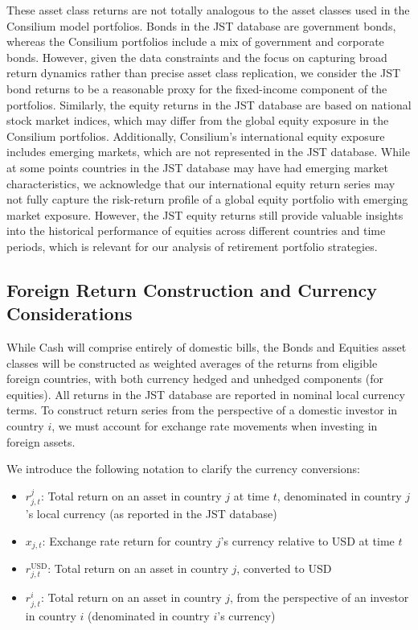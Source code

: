 \documentclass[11pt]{article}
\begin{document}
These asset class returns are not totally analogous to the asset classes used in the Consilium model portfolios. Bonds in the JST database are government bonds, whereas the Consilium portfolios include a mix of government and corporate bonds. However, given the data constraints and the focus on capturing broad return dynamics rather than precise asset class replication, we consider the JST bond returns to be a reasonable proxy for the fixed-income component of the portfolios. Similarly, the equity returns in the JST database are based on national stock market indices, which may differ from the global equity exposure in the Consilium portfolios. Additionally, Consilium's international equity exposure includes emerging markets, which are not represented in the JST database. While at some points countries in the JST database may have had emerging market characteristics, we acknowledge that our international equity return series may not fully capture the risk-return profile of a global equity portfolio with emerging market exposure. However, the JST equity returns still provide valuable insights into the historical performance of equities across different countries and time periods, which is relevant for our analysis of retirement portfolio strategies.


\subsection{Foreign Return Construction and Currency Considerations}
\label{appendix:asset_class_returns:currency_considerations}

While Cash will comprise entirely of domestic bills, the Bonds and Equities asset classes will be constructed as weighted averages of the returns from eligible foreign countries, with both currency hedged and unhedged components (for equities). All returns in the JST database are reported in nominal local currency terms. To construct return series from the perspective of a domestic investor in country $i$, we must account for exchange rate movements when investing in foreign assets.

We introduce the following notation to clarify the currency conversions:
\begin{itemize}
    \item $r^{j}_{j,t}$: Total return on an asset in country $j$ at time $t$, denominated in country $j$'s local currency (as reported in the JST database)
    \item $x_{j,t}$: Exchange rate return for country $j$'s currency relative to USD at time $t$
    \item $r^{\text{USD}}_{j,t}$: Total return on an asset in country $j$, converted to USD
    \item $r^{i}_{j,t}$: Total return on an asset in country $j$, from the perspective of an investor in country $i$ (denominated in country $i$'s currency)
\end{itemize}
\end{document}
